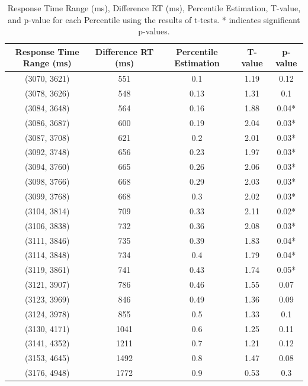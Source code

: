 \documentclass[12pt,oneside,openright]{report}
\begin{document}
\begin{table}[!ht]
    \centering
    \begin{tabular}{ccccc}
    \hline
    \textbf{Response Time Range (ms)} & \textbf{Difference RT (ms)} & \textbf{Percentile Estimation} & \textbf{T-value} & \textbf{p-value} \\ \hline
    (3070, 3621) & 551 & 0.1  & 1.19 & 0.12 \\
    (3078, 3626) & 548 & 0.13 & 1.31 & 0.1  \\
    (3084, 3648) & 564 & 0.16 & 1.88 & 0.04* \\
    (3086, 3687) & 600 & 0.19 & 2.04 & 0.03* \\
    (3087, 3708) & 621 & 0.2  & 2.01 & 0.03* \\
    (3092, 3748) & 656 & 0.23 & 1.97 & 0.03* \\
    (3094, 3760) & 665 & 0.26 & 2.06 & 0.03* \\
    (3098, 3766) & 668 & 0.29 & 2.03 & 0.03* \\
    (3099, 3768) & 668 & 0.3  & 2.02 & 0.03* \\
    (3104, 3814) & 709 & 0.33 & 2.11 & 0.02* \\
    (3106, 3838) & 732 & 0.36 & 2.08 & 0.03* \\
    (3111, 3846) & 735 & 0.39 & 1.83 & 0.04* \\
    (3114, 3848) & 734 & 0.4  & 1.79 & 0.04* \\
    (3119, 3861) & 741 & 0.43 & 1.74 & 0.05* \\
    (3121, 3907) & 786 & 0.46 & 1.55 & 0.07  \\
    (3123, 3969) & 846 & 0.49 & 1.36 & 0.09  \\
    (3124, 3978) & 855 & 0.5  & 1.33 & 0.1   \\
    (3130, 4171) & 1041 & 0.6  & 1.25 & 0.11  \\
    (3141, 4352) & 1211 & 0.7  & 1.21 & 0.12  \\
    (3153, 4645) & 1492 & 0.8  & 1.47 & 0.08  \\
    (3176, 4948) & 1772 & 0.9  & 0.53 & 0.3   \\ \hline
    \end{tabular}
    \caption{Response Time Range (ms), Difference RT (ms), Percentile Estimation, T-value, and p-value for each Percentile using the results of t-tests. * indicates significant p-values.}
    \label{tab:response-time-range}
\end{table}
\end{document}
